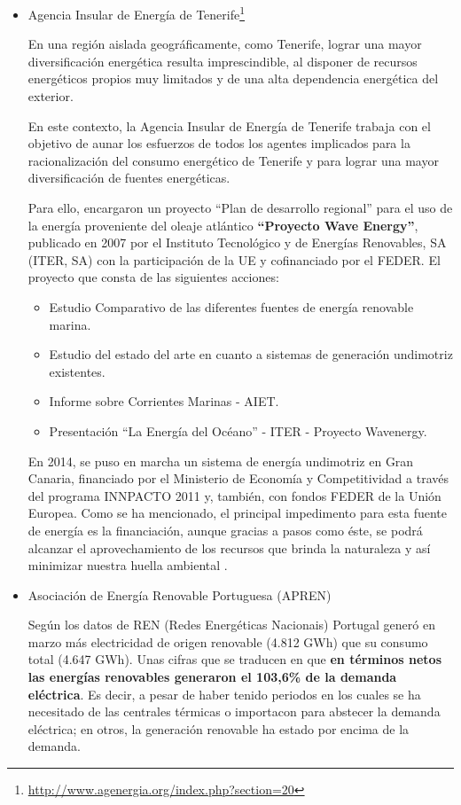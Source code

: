 \begin{itemize}
\item
  Agencia Insular de Energía de Tenerife\footnote{\url{http://www.agenergia.org/index.php?section=20}}

  En una región aislada geográficamente, como Tenerife, lograr una mayor
  diversificación energética resulta imprescindible, al disponer de
  recursos energéticos propios muy limitados y de una alta dependencia
  energética del exterior.

  En este contexto, la Agencia Insular de Energía de Tenerife \cite{wavegen} trabaja
  con el objetivo de aunar los esfuerzos de todos los agentes implicados
  para la racionalización del consumo energético de Tenerife y para
  lograr una mayor diversificación de fuentes energéticas.

  Para ello, encargaron un proyecto ``Plan de desarrollo regional'' para el
  uso de la energía proveniente del oleaje atlántico \textbf{``Proyecto
  Wave Energy''}, publicado en 2007 por el Instituto Tecnológico y de
  Energías Renovables, SA (ITER, SA) con la participación de la UE y
  cofinanciado por el FEDER. El proyecto que consta de las siguientes
  acciones:

  \begin{itemize}
  \item
    Estudio Comparativo de las diferentes fuentes de energía renovable marina.
  \item
    Estudio del estado del arte en cuanto a sistemas de generación undimotriz existentes.
  \item
    Informe sobre Corrientes Marinas - AIET.
  \item
    Presentación ``La Energía del Océano'' - ITER - Proyecto Wavenergy.
  \end{itemize}

  En 2014, se puso en marcha un sistema de energía undimotriz en Gran
  Canaria, financiado por el Ministerio de Economía y Competitividad a
  través del programa INNPACTO 2011 y, también, con fondos FEDER de la
  Unión Europea. Como se ha mencionado, el principal impedimento para
  esta fuente de energía es la financiación, aunque gracias a pasos como
  éste, se podrá alcanzar el aprovechamiento de los recursos que brinda
  la naturaleza y así minimizar nuestra huella ambiental \cite{siblog}.

\item
  Asociación de Energía Renovable Portuguesa (APREN)

  Según los datos de REN (Redes Energéticas Nacionais) Portugal generó
  en marzo más electricidad de origen renovable (4.812 GWh) que su
  consumo total (4.647 GWh). Unas cifras que se traducen en que
  \textbf{en términos netos las energías renovables generaron el 103,6\%
  de la demanda eléctrica}. Es decir, a pesar de haber tenido periodos
  en los cuales se ha necesitado de las centrales térmicas o importacon
  para abstecer la demanda eléctrica; en otros, la generación renovable
  ha estado por encima de la demanda.


\end{itemize}
